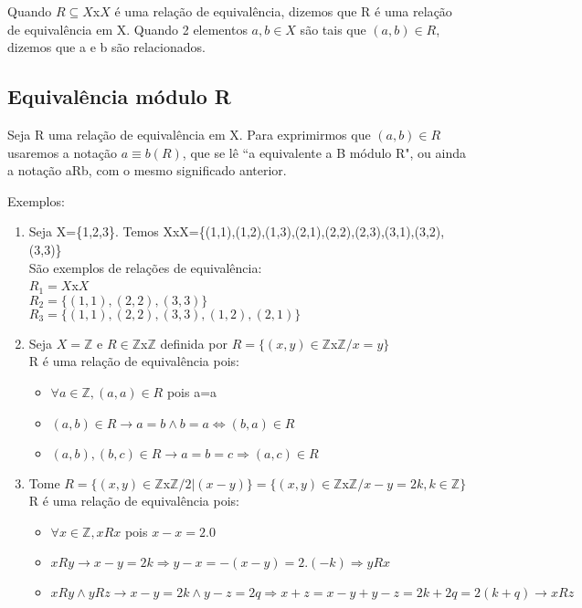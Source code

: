 Quando $R\subseteq X$x$X$ {\'e} uma rela{\c c}{\~a}o de equival{\^e}ncia, dizemos que R {\'e} uma rela{\c c}{\~a}o de equival{\^e}ncia em X. Quando 2 elementos $a,b\in X$ s{\~a}o tais que $(a,b)\in R$, dizemos que a e b s{\~a}o relacionados.\\

\subsection{Equival{\^e}ncia m{\'o}dulo R}

\begin{nota} Seja R uma rela{\c c}{\~a}o de equival{\^e}ncia em X. Para exprimirmos que $(a,b)\in R$ usaremos a nota{\c c}{\~a}o $a\equiv b(R)$, que se l{\^e} ``a equivalente a B m{\'o}dulo R", ou ainda a nota{\c c}{\~a}o aRb, com o mesmo significado anterior.\end{nota}

Exemplos:
\begin{enumerate}
\item Seja X=\{1,2,3\}. Temos XxX=\{(1,1),(1,2),(1,3),(2,1),(2,2),(2,3),(3,1),(3,2),(3,3)\}\\
S{\~a}o exemplos de rela{\c c}{\~o}es de equival{\^e}ncia:\\
$R_{1}=X$x$X$\\
$R_{2}=\{(1,1),(2,2),(3,3)\}$\\
$R_{3}=\{(1,1),(2,2),(3,3),(1,2),(2,1)\}$
\item Seja $X=\mathbb{Z}$ e $R\in \mathbb{Z}$x$\mathbb{Z}$ definida por $R=\{(x,y)\in \mathbb{Z}$x$\mathbb{Z} /x=y\}$\\
R {\'e} uma rela{\c c}{\~a}o de equival{\^e}ncia pois:
\begin{itemize}
\item $\forall a \in \mathbb{Z}, (a,a) \in R$ pois a=a
\item $(a,b)\in R \rightarrow a=b \wedge b=a \Leftrightarrow (b,a)\in R$
\item $(a,b),(b,c)\in R \rightarrow a=b=c\Rightarrow (a,c)\in R$
\end{itemize}
\item Tome $R=\{(x,y)\in \mathbb{Z}$x$\mathbb{Z}/ 2|(x-y)\}=\{(x,y)\in\mathbb{Z}$x$\mathbb{Z}/ x-y=2k, k\in\mathbb{Z}\}$\\
R {\'e} uma rela{\c c}{\~a}o de equival{\^e}ncia pois:
\begin{itemize}
\item $\forall x\in\mathbb{Z},xRx$ pois $x-x=2.0$
\item $xRy\rightarrow x-y=2k\Rightarrow y-x=-(x-y)=2.(-k)\Rightarrow yRx$
\item $xRy\wedge yRz\rightarrow x-y=2k\wedge y-z=2q\Rightarrow x+z=x-y+y-z=2k+2q=2(k+q)\rightarrow xRz$

\end{itemize}
\end{enumerate}


